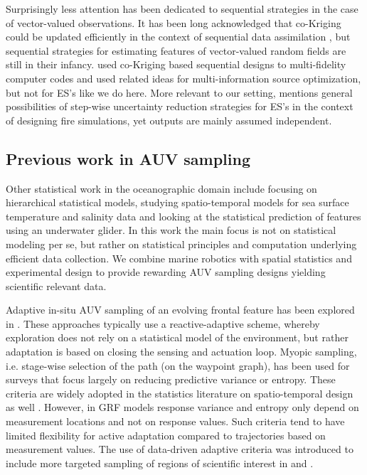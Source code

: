 \documentclass[aoas,preprint]{imsart}
\begin{document}
Surprisingly less attention has been dedicated to sequential
strategies in the case of vector-valued observations. It has been long
acknowledged that co-Kriging could be updated efficiently in the
context of sequential data assimilation \citep{Vargas-Guzman1999}, but
sequential strategies for estimating features of vector-valued random
fields are still in their infancy. \cite{LeGratiet.etal2015} used
co-Kriging based sequential designs to multi-fidelity computer codes
and \cite{Poloczek2017} used related ideas for multi-information
source optimization, but not for ES's like we do here. More relevant
to our setting, \citet[p.82]{stroh} mentions general possibilities of
step-wise uncertainty reduction strategies for ES's in the context of
designing fire simulations, yet outputs are mainly assumed
independent.

\subsection{Previous work in AUV sampling}

Other statistical work in the oceanographic domain include
\cite{wikle2013modern} focusing on hierarchical statistical models,
\cite{sahu2008space} studying spatio-temporal models for sea surface
temperature and salinity data and \cite{mellucci2018oceanic} looking
at the statistical prediction of features using an underwater glider.
In this work the main focus is not on statistical modeling per se, but
rather on statistical principles and computation underlying efficient
data collection. We combine marine robotics
with spatial statistics and experimental design to provide rewarding AUV
sampling designs yielding scientific relevant data.

Adaptive in-situ AUV sampling of an evolving frontal feature has been
explored in \cite{fronts11,Smith2016,Pinto2018,costa19}. These
approaches typically use a reactive-adaptive scheme, whereby
exploration does not rely on a statistical model of the environment,
but rather adaptation is based on closing the sensing and actuation
loop. Myopic sampling, i.e. stage-wise selection of the path (on the
waypoint graph), has been used for surveys
\citep{singh2009efficient,Binney2013} that focus largely on reducing
predictive variance or entropy. These criteria are widely adopted in
the statistics literature on spatio-temporal design as well
\citep{bueso1998state,zidek2019monitoring}. However, in GRF models response variance and entropy only depend on measurement locations and not on response values. Such criteria tend to have limited flexibility for
active adaptation compared to trajectories based on measurement values. The use
of data-driven adaptive criteria was introduced to include more
targeted sampling of regions of scientific interest in \cite{Low2009}
and \cite{fossuminformation}.
\end{document}
